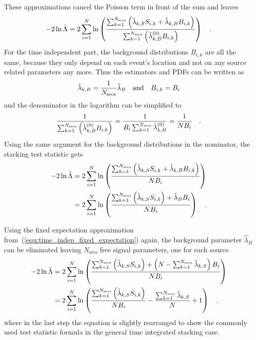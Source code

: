 These approximations cancel the Poisson term in front of the sum and leaves
\begin{equation}
  -2\ln\hat{\Lambda}
  = 2\sum_{i=1}^N \ln\left(
    \frac{\sum_{k=1}^{N_\text{srcs}}\left(
          \hat{\lambda}_{k,S} S_{i,k}+\hat{\lambda}_{k,B} B_{i,k}\right)}
          {\sum_{k=1}^{N_\text{srcs}}\left(
            \hat{\lambda}_{k,B}^{(0)} B_{i,k} \right)}
        \right)
  \quad\text{.}
\end{equation}
For the time independent part, the background distributions $B_{i,k}$ are all the same, because they only depend on each event's location and not on any source related parameters any more.
Thus the estimators and PDFs can be written as
\begin{equation}
  \hat{\lambda}_{k,B} = \frac{1}{N_\text{srcs}} \hat{\lambda}_B
  \quad\text{and}\quad B_{i,k} = B_i
\end{equation}
and the denominator in the logarithm can be simplified to
\begin{equation}
  \frac{1}{\sum_{k=1}^{N_\text{srcs}}\left(
           \hat{\lambda}_{k,B}^{(0)}B_{i,k} \right)}
  = \frac{1}{B_i \sum_{k=1}^{N_\text{srcs}}\hat{\lambda}_{k,B}^{(0)}}
  = \frac{1}{N B_i}
  \quad\text{.}
\end{equation}
Using the same argument for the background distributions in the nominator, the stacking test statistic gets
\begin{align}
  -2\ln\hat{\Lambda}
  &= 2\sum_{i=1}^N \ln\left(
    \frac{\sum_{k=1}^{N_\text{srcs}}\left(
          \hat{\lambda}_{k,S} S_{i,k}+\hat{\lambda}_{k,B} B_{i,k}\right)}
          {N B_i} \right) \\
  &= 2\sum_{i=1}^N \ln\left(
    \frac{\sum_{k=1}^{N_\text{srcs}}\left(\hat{\lambda}_{k,S} S_{i,k}\right) +
          \hat{\lambda}_B B_i}{N B_i} \right)
  \quad\text{.}
\end{align}

Using the fixed expectation approximation from~(\ref{equ:time_indep_fixed_expectation}) again, the background parameter $\hat{\lambda}_B$ can be eliminated leaving $N_\text{srcs}$ free signal parameters, one for each source
\begin{align}
  -2\ln\hat{\Lambda}
  &= 2\sum_{i=1}^N \ln\left(
    \frac{\sum_{k=1}^{N_\text{srcs}}\left(\hat{\lambda}_{k,S} S_{i,k}\right) +
          \left(
            N - \sum_{k=1}^{N_\text{srcs}}\hat{\lambda}_{k,S}
          \right) B_i}{N B_i} \right) \\
  &= 2\sum_{i=1}^N \ln\left(
      \frac{\sum_{k=1}^{N_\text{srcs}}\left(\hat{\lambda}_{k,S}
              S_{i,k}\right)}{N B_i} -
      \frac{\sum_{k=1}^{N_\text{srcs}}\hat{\lambda}_{k,S}}{N} + 1
    \right)
  \quad\text{.}
\end{align}
where in the last step the equation is slightly rearranged to show the commonly used test statistic formula in the general time integrated stacking case.

